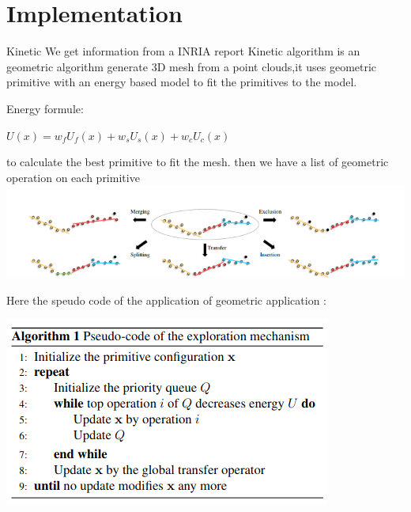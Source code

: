 \documentclass[10pt]{beamer}
\begin{document}
\section{Implementation}
\begin{frame}{Kinetic}
We get information from a INRIA report \cite{yu:hal-03621896}
Kinetic algorithm is an geometric algorithm generate 3D mesh from a point clouds,it uses  geometric primitive with an energy based model to fit the primitives to the model.

Energy formule: 
\newline
\begin{center}
    $        U(x) = w_f U_f(x) + w_s U_s(x) + w_c U_c(x)       $
\end{center}

to calculate the best primitive to fit the mesh.
then we have a list of geometric operation on each primitive
\includegraphics[scale=0.5]{../../images/geometric_operation.png}
\end{frame}
\begin{frame}
    
    Here the speudo code of the application of geometric application : 
    
    \begin{center}
        \includegraphics[scale =  0.5]{../../images/Pseudo_code_exploration.png}
      \end{center} 
\end{frame}
\end{document}
